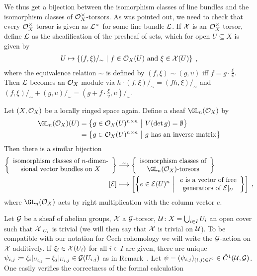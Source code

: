 \documentclass[a4paper,parskip=half,numbers=enddot, DIV=12]{scrreprt}
\newcommand{\vC}{\v{C}}
\begin{document}
\begin{example}
\begin{alphanumerate}
		We thus get a bijection between the isomorphism classes of line bundles and the isomorphism classes of $\mathcal{O}_X^\times$-torsors. As was pointed out, we need to check that every $\mathcal{O}_X^\times$-torsor is given as $\mathcal{L}^\times$ for some line bundle $\mathcal{L}$. If $\mathcal{X}$ is an $\mathcal{O}_X^\times$-torsor, define $\mathcal{L}$ as the sheafification of the presheaf of sets, which for open $U\subseteq X$ is given by
		\begin{align*}
			U\mapsto \left\{(f,\xi)/_\sim\ \middle|\  f\in\mathcal{O}_X(U)\text{ and }\xi\in\mathcal{X}(U)\right\}\;,
		\end{align*}
		where the equivalence relation $\sim$ is defined by $(f,\xi)\sim (g,\upsilon)$ iff $f=g\cdot\frac{\xi}{\upsilon}$. Then $\mathcal{L}$ becomes an $\mathcal{O}_X$-module via $h\cdot (f,\xi)/_\sim=(fh,\xi)/_\sim$ and $(f,\xi)/_\sim+(g,\upsilon)/_\sim=\left(g+f\cdot \frac{\xi}{\upsilon},\upsilon\right)/_\sim$.
		\item Let $(X,\mathcal{O}_X)$ be a locally ringed space again. Define a sheaf $\GL_n(\Oo_X)$ by
		\begin{align*}
			\GL_n(\Oo_X)(U)&=\left\{g\in\Oo_X(U)^{n\times n}\st V(\det g)=\emptyset\right\}\\
			&=\left\{g\in\Oo_X(U)^{n\times n}\st g\text{ has an inverse matrix}\right\}
		\end{align*}
		Then there is a similar bijection
		\begin{align*}
			\left\{\begin{array}{c}
				\text{isomorphism classes of }n\text{-dimen-}\\
				\text{sional vector bundles on }X
			\end{array}
			\right\} & \isomorphism\left\{\begin{array}{c}
			\text{isomorphism classes of}\\
			\GL_n(\Oo_X)\text{-torsors}
			\end{array}
			\right\}\\
			[\Ee]&\longmapsto \left[\left\{e\in\Ee(U)^n\st 
			\begin{array}{c}
			e\text{ is a vector of free}\\
			\text{generators of }\Ee|_U
			\end{array}
			\right\}\right]\;,
		\end{align*}
		where $\GL_n(\Oo_X)$ acts by right multiplication with the column vector $e$.
	\end{alphanumerate}
\end{example}
Let $\mathcal{G}$ be a sheaf of abelian groups, $\mathcal{X}$ a $\mathcal{G}$-torsor, $\mathcal{U}\colon X=\bigcup_{i\in I}U_i$ an open cover such that $\mathcal{X}|_{U_i}$ is trivial (we will then say that $\mathcal{X}$ is trivial on $\mathcal{U}$). To be compatible with our notation for \vC ech cohomology we will write the $\mathcal{G}$-action on $\mathcal{X}$ additively. If $\xi_i\in\mathcal{X}(U_i)$ for all $i\in I$ are given, there are unique $\psi_{i,j}\coloneqq \xi_i|_{U_{i,j}}-\xi_j|_{U_{i,j}}\in\mathcal{G}(U_{i,j})$ as in Remark~. Let $\psi=(\psi_{i,j})_{(i,j)\in I^2}\in\check{C}^1(\mathcal{U},\mathcal{G})$. One easily verifies the correctness of the formal calculation
\end{document}
